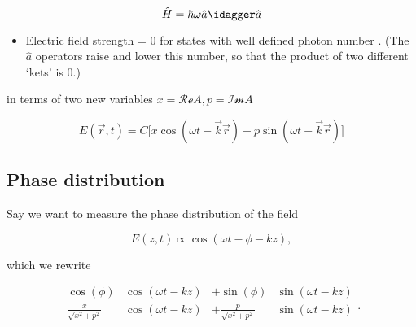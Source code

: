   \[
    \hat{H} = \hbar\omega\hat{a}\idagger\hat{a}
  \]

  \begin{framed}\noindent
    \begin{itemize}
    \item  Electric field  strength   = 0  for states
      with  well defined  photon  number .   (The  $ \hat{a}  $
      operators raise and lower this number, so that the product of two
      different `kets' is 0.)
    \end{itemize}
  \end{framed}

  \noindent      in      terms      of      two      new      variables
  $ x = \mathcal{Re}{A}, p =\mathcal{Im}{A} $

  \begin{equation}
    E(\vec{r},t) = C\bigg[x\cos(\omega t - \vec{k}\vec{r}) + p\sin(\omega t - \vec{k}\vec{r})\bigg]
  \end{equation}

 \subsection{Phase distribution}
 Say we want to measure the phase distribution of the field

  \begin{equation}
    E(z,t) \propto \cos(\omega t - \phi - kz),
  \end{equation}

  \noindent which we rewrite

  \begin{equation}
    \begin{aligned}
      \cos(\phi)& \cos(\omega t - kz) &+ \sin(\phi)&\sin(\omega t - kz)\\
      \frac{x}{\sqrt{x^2+p^2}} & \cos(\omega t - kz) &+ \frac{p}{\sqrt{x^2+p^2}}&\sin(\omega t - kz)\\
    \end{aligned}.
  \end{equation}

